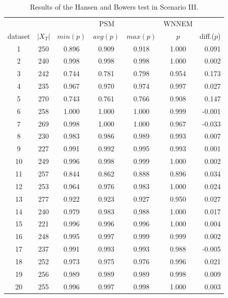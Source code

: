 		\begin{table}[h]
			\caption{Results of the Hansen and Bowers test in Scenario III. %
			}
			\label{tab:wnnem_scen_III_stat_separated}
			\centering
			\begin{tabular}{ccccccr} 
				\toprule
				& & \multicolumn{3}{c}{PSM}
				& WNNEM & \\
				dataset & $|X_T|$ & $min (p)$ & $avg (p)$ & $max (p)$ & $p$   & diff.($p$) \\
				\midrule
				1       & 250     & 0.896     & 0.909     & 0.918     & 1.000 & 0.091      \\
				2       & 240     & 0.998     & 0.998     & 0.998     & 1.000 & 0.002      \\
				3       & 242     & 0.744     & 0.781     & 0.798     & 0.954 & 0.173      \\
				4       & 235     & 0.967     & 0.970     & 0.974     & 0.997 & 0.027      \\
				5       & 270     & 0.743     & 0.761     & 0.766     & 0.908 & 0.147      \\
				6       & 258     & 1.000     & 1.000     & 1.000     & 0.999 & -0.001     \\
				7       & 269     & 0.998     & 1.000     & 1.000     & 0.967 & -0.033     \\
				8       & 230     & 0.983     & 0.986     & 0.989     & 0.993 & 0.007      \\
				9       & 227     & 0.991     & 0.992     & 0.995     & 0.993 & 0.001      \\
				10      & 249     & 0.996     & 0.998     & 0.999     & 1.000 & 0.002      \\
				11      & 257     & 0.844     & 0.862     & 0.888     & 0.896 & 0.034      \\
				12      & 253     & 0.964     & 0.976     & 0.983     & 1.000 & 0.024      \\
				13      & 277     & 0.922     & 0.923     & 0.927     & 0.950 & 0.027      \\
				14      & 240     & 0.979     & 0.983     & 0.988     & 1.000 & 0.017      \\
				15      & 221     & 0.996     & 0.996     & 0.996     & 1.000 & 0.004      \\
				16      & 248     & 0.995     & 0.997     & 0.999     & 0.999 & 0.002      \\
				17      & 237     & 0.991     & 0.993     & 0.993     & 0.988 & -0.005     \\
				18      & 252     & 0.973     & 0.975     & 0.976     & 0.996 & 0.021      \\
				19      & 256     & 0.989     & 0.989     & 0.989     & 0.998 & 0.009      \\
				20      & 255     & 0.996     & 0.997     & 0.998     & 1.000 & 0.003      \\
																

\end{tabular}
\end{table}
